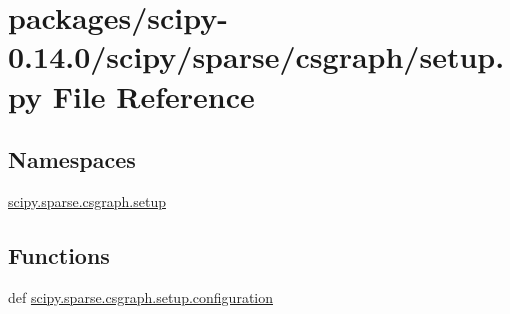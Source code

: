 \hypertarget{packages_2scipy-0_814_80_2scipy_2sparse_2csgraph_2setup_8py}{}\section{packages/scipy-\/0.14.0/scipy/sparse/csgraph/setup.py File Reference}
\label{packages_2scipy-0_814_80_2scipy_2sparse_2csgraph_2setup_8py}
\subsection*{Namespaces}
\begin{DoxyCompactItemize}
\item 
 \hyperlink{namespacescipy_1_1sparse_1_1csgraph_1_1setup}{scipy.\+sparse.\+csgraph.\+setup}
\end{DoxyCompactItemize}
\subsection*{Functions}
\begin{DoxyCompactItemize}
\item 
def \hyperlink{namespacescipy_1_1sparse_1_1csgraph_1_1setup_a9b63f8526c8a4b4f5f6af385de56cd09}{scipy.\+sparse.\+csgraph.\+setup.\+configuration}
\end{DoxyCompactItemize}
